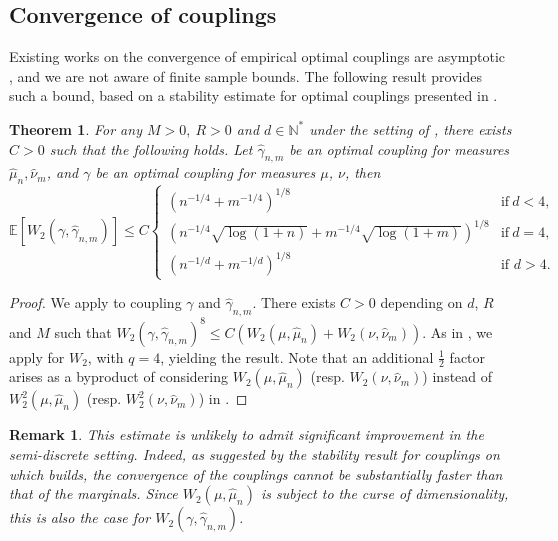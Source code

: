 \documentclass[11pt]{article}
\newtheorem{theorem}[lemma]{Theorem}
\newtheorem{remark}[lemma]{Remark}
\newcommand{\1}{\mathbbm{1}}
\numberwithin{equation}{section}
\begin{document}
\subsection{Convergence of couplings}
\label{sec:couplings}
Existing works on the convergence of empirical optimal couplings are asymptotic \cite{seguy2018large, segers2022graphical}, and we are not aware of finite sample bounds. The following result provides such a bound, based on a stability estimate for optimal couplings presented in . 
\begin{theorem}
    For any $M>0,\:R>0$ and $d\in \mathbb{N}^*$
     under the setting of ,  there exists $C>0$ such that the following holds. Let $\hat{\gamma}_{n,m}$ be an optimal coupling for measures $\hat{\mu}_n, \hat{\nu}_m$, and $\gamma$ be an optimal coupling for measures $\mu$, $\nu$, then 
         \begin{equation*}
        \mathbb{E}\left[W_2(\gamma,\hat{\gamma}_{n,m})\right]\leq C \begin{cases}
        \left( n^{-1/4}+m^{-1/4}\right)^{1/8} & \text{if}\: d<4 ,\\
        \left(n^{-1/4}\sqrt{\log(1+n)}+m^{-1/4}\sqrt{\log(1+m)}\right)^{1/8} & \text{if}\: d=4,\\
        \left( n^{-1/d} +m^{-1/d}\right)^{1/8} & \text{if } d > 4.
        \end{cases}
    \end{equation*}
    \label{th:stat_result_couplings}
\end{theorem}
\begin{proof}
    We apply  to coupling $\gamma$ and $\hat{\gamma}_{n,m}$. There exists $C>0$ depending on $d$, $R$ and $M$ such that $W_2(\gamma,\hat{\gamma}_{n,m})^8\leq C(W_2(\mu,\hat{\mu}_n)+W_2(\nu,\hat{\nu}_m))$. As in , we apply \cite[Main Theorem]{fournier2015rate} for $W_2$, with $q=4$, yielding the result. Note that an additional $\frac{1}{2}$ factor arises as a byproduct of considering $W_2(\mu,\hat{\mu}_n)$ (resp. $W_2(\nu,\hat{\nu}_m)$) instead of $W_2^2(\mu,\hat{\mu}_n)$ (resp. $W_2^2(\nu,\hat{\nu}_m)$) in \cite{fournier2015rate}.
\end{proof}
\begin{remark}
    This estimate is unlikely to admit significant improvement in the semi-discrete setting. Indeed, as suggested by the stability result for couplings on which  builds, the convergence of the couplings cannot be substantially faster than that of the marginals. Since $W_2(\mu,\hat{\mu}_n)$ is subject to the curse of dimensionality, this is also the case for $W_2(\gamma,\hat{\gamma}_{n,m})$.    
\end{remark}
\end{document}
